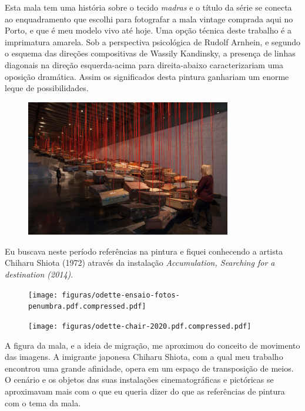 Esta mala tem uma história sobre o tecido \emph{madras} e o título da
série se conecta ao enquadramento que escolhi para fotografar a mala
vintage comprada aqui no Porto, e que é meu modelo vivo até hoje. Uma
opção técnica deste trabalho é a imprimatura amarela. Sob a perspectiva
psicológica de Rudolf Arnhein, e segundo o esquema das direções
compositivas de Wassily Kandinsky, a presença de linhas diagonais na
direção esquerda-acima para direita-abaixo caracterizariam uma oposição
dramática. Assim os significados desta pintura ganhariam um enorme
leque de possibilidades.

\begin{figure}
  \flushright
  \begin{minipage}{3.92715in+1cm}
	\caption{}
	\includegraphics[width=3.52715in]{figuras/shaw-accumulation-searching-for-the-destination.pdf.compressed.pdf}
\end{minipage}
\end{figure}


Eu buscava neste período referências na pintura e fiquei conhecendo a
artista Chiharu Shiota (1972) através da instalação \emph{Accumulation,
	Searching for a destination (2014)}.

\begin{figure}
  \begin{minipage}[t]{.45\linewidth}
	\caption{}

	\texttt{[image: figuras/odette-ensaio-fotos-penumbra.pdf.compressed.pdf]}
\end{minipage}\hfill
\begin{minipage}[t]{.45\linewidth}
  \caption{ \phantom{aaaaaaaaaaaaaaaaaaaaaaaaaaaaaaaaaaaa}}

	\texttt{[image: figuras/odette-chair-2020.pdf.compressed.pdf]}
\end{minipage}
\end{figure}
A figura da mala, e a ideia de migração, me aproximou do conceito de
movimento das imagens. A imigrante japonesa Chiharu Shiota, com a qual
meu trabalho encontrou uma grande afinidade, opera em um espaço de
transposição de meios. O cenário e os objetos das suas instalações
cinematográficas e pictóricas se aproximavam mais com o que eu queria
dizer do que as referências de pintura com o tema da mala.

